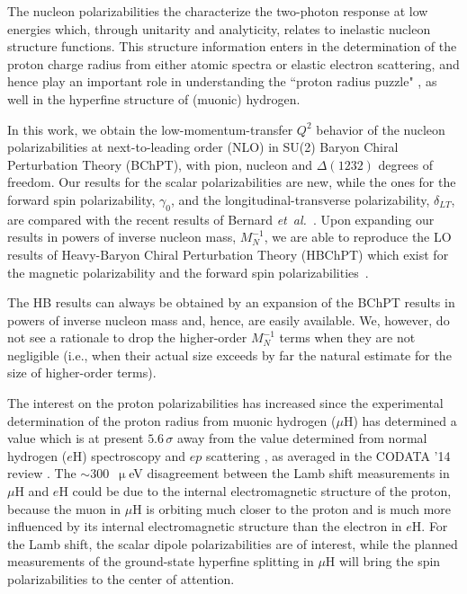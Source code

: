 \documentclass[twocolumn,prc,showpacs,nofootinbib,preprintnumbers,amsmath,amssymb,superscriptaddress]{revtex4-1}
\begin{document}
The nucleon polarizabilities  the  characterize the two-photon response
at low energies which, through unitarity and analyticity, relates to
inelastic nucleon structure functions.
This structure information enters in the determination of the proton charge radius from
either atomic spectra or elastic electron scattering, and hence play an important role
in understanding the ``proton radius puzzle" \cite{Pohl:2010zza,Antognini:1900ns,Pohl:2013yb,Hagelstein:2015egb}, as well in the 
hyperfine structure of (muonic) hydrogen.

In this work, we obtain the low-momentum-transfer $Q^2$ behavior of the
nucleon polarizabilities at next-to-leading order (NLO) in SU(2) Baryon
Chiral Perturbation Theory (BChPT), with pion, nucleon and $\Delta(1232)$ degrees of freedom.  Our results for the scalar
polarizabilities are new, while the ones for the forward spin polarizability, $\gamma_0$, and the longitudinal-transverse polarizability, $\delta_{LT}$,
are compared with the recent results of
Bernard {\it et~al.}~\cite{Bernard:2012hb}. 
Upon expanding our results in powers of inverse nucleon mass, $M_N^{-1}$, we are able to reproduce the LO results
of Heavy-Baryon Chiral Perturbation Theory (HBChPT) 
which exist for the magnetic polarizability \cite{Birse:2012eb} 
and the forward spin polarizabilities~\cite{Kao:2002cp}.


The HB results can always be obtained by an expansion
of the BChPT results in powers of inverse nucleon mass and, hence, are easily available. We, however, do not see a rationale to drop the higher-order $M_N^{-1}$ terms when they are not 
negligible (i.e., when their actual size exceeds by far the natural estimate
for the size of higher-order terms).

The interest on the proton polarizabilities has increased since the experimental determination of the proton radius from muonic hydrogen ($\mu$H) \cite{Pohl:2010zza,Antognini:1900ns} has determined a value which is at present $5.6\,\sigma$ away from the value determined from normal hydrogen ($e$H) spectroscopy and $ep$ scattering \cite{Bernauer:2010wm}, as averaged in the CODATA '14 review \cite{Mohr:2015ccw}. The $\sim 300$~$\upmu$eV disagreement between the Lamb shift measurements in $\mu$H and $e$H could be due to the internal electromagnetic structure of the proton, because the muon in $\mu$H is orbiting much closer to the proton and is much more influenced by its internal electromagnetic structure than the electron in $e$H. For the Lamb shift, the scalar dipole polarizabilities are of interest, while the planned measurements of the ground-state hyperfine splitting in $\mu$H \cite{Pohl:2016xsr} will bring the spin polarizabilities to the center of attention.
\end{document}
